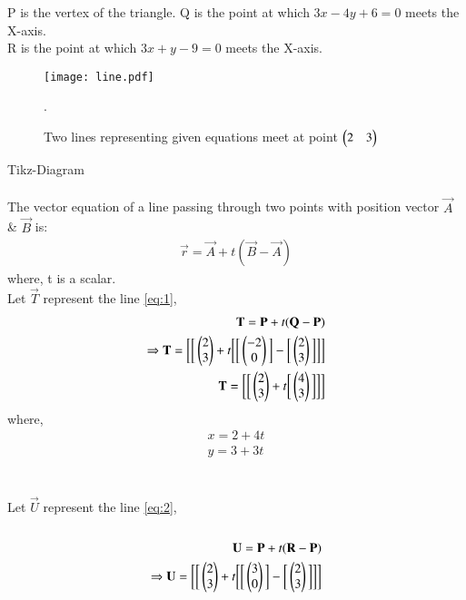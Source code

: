 \documentclass[journal,12pt,twocolumn]{IEEEtran}
\renewcommand\thesection{\arabic{section}}
\begin{document}
\begin{enumerate}[label=\thesection.\arabic*.,ref=\thesection.\theenumi]
\begin{enumerate}
        P is the vertex of the triangle.
        Q is the point at which \(3x-4y+6=0\) meets the X-axis.\\
        R is the point at which \(3x+y-9=0\) meets the X-axis.\\
\end{enumerate}
\begin{figure}[h]
\texttt{[image: line.pdf]}
\caption{Two lines representing given equations meet at point $\begin{pmatrix}2 & 3\end{pmatrix}$ }.
\end{figure}
Tikz-Diagram
\\\\
The vector equation of a line passing through two points with position vector $\vec{A}$ \& $\vec{B}$ is:\begin{align}
    \vec{r}=\vec{A}+t(\vec{B}-\vec{A})
\end{align}
where, t is a scalar.
\\
Let $\vec{T}$ represent the line \ref{eq:1},\\
\begin{align}
    \mathbf{T}=\mathbf{P}+t(\mathbf{Q}-\mathbf{P})\\
     \Rightarrow\mathbf{T}=\bigg[\bigg[\begin{pmatrix}2\\3\end{pmatrix}+t\bigg[\bigg[\begin{pmatrix}-2\\0\end{pmatrix}\bigg]-\bigg[\begin{pmatrix}2\\3\end{pmatrix}\bigg]\bigg]\bigg]\\
\mathbf{T}=\bigg[\bigg[\begin{pmatrix}2\\3\end{pmatrix} +t\bigg[\begin{pmatrix}4\\3\end{pmatrix}\bigg]\bigg]\bigg]\end{align}
where, \begin{align}
    x=2+4t\\y=3+3t
\end{align}
\\\\
Let $\vec{U}$ represent the line \ref{eq:2},\\\\
\begin{align}
    \vec{U}=\vec{P}+t(\vec{R}-\vec{P})\\
\Rightarrow\vec{U}=\bigg[\bigg[\myvec{2\\3}+t\bigg[\bigg[\myvec{3\\0}\bigg]-\bigg[\myvec{2\\3}\bigg]\bigg]\bigg]\\

\end{align}
\end{enumerate}
\end{document}
